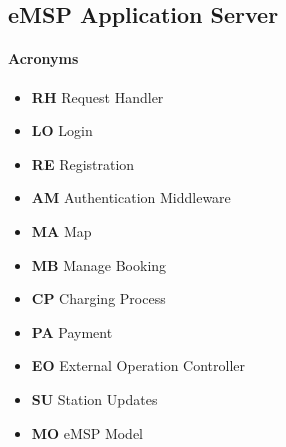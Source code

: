 \subsection{eMSP Application Server}
\paragraph{Acronyms} 
\begin{itemize} [label={--}]
    \item \textbf{RH} Request Handler
    \item \textbf{LO} Login
    \item \textbf{RE} Registration
    \item \textbf{AM} Authentication Middleware
    \item \textbf{MA} Map
    \item \textbf{MB} Manage Booking
    \item \textbf{CP} Charging Process
    \item \textbf{PA} Payment
    \item \textbf{EO} External Operation Controller
    \item \textbf{SU} Station Updates
    \item \textbf{MO} eMSP Model
\end{itemize}
